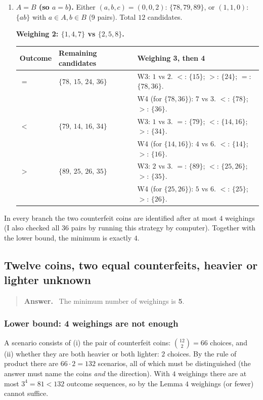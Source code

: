 \documentclass[11pt,a4paper]{article}
\renewcommand{\arraystretch}{1.15}
\newenvironment{answerbox}[1][Answer]{\par\smallskip\begin{quote}\textbf{#1.}\ }{\end{quote}}
\theoremstyle{definition}
\begin{document}
\begin{enumerate}[label=\textbf{Case \arabic*.},leftmargin=*,itemsep=6pt]
\item \textbf{$A=B$ (so $a=b$).} Either $(a,b,c)=(0,0,2)$: $\{78,79,89\}$, or $(1,1,0)$: $\{ab\}$ with $a\in A,b\in B$ (9 pairs). Total $12$ candidates.

 \textbf{Weighing 2: $\{1,4,7\}$ vs $\{2,5,8\}$.}
 \begin{center}\small
 \renewcommand{\arraystretch}{1.2}
 \begin{tabular}{@{}lll@{}}
 \toprule
 Outcome & Remaining candidates & Weighing 3, then 4 \\
 \midrule
 $=$ & $\{78,\,15,\,24,\,36\}$ & W3: $1$ vs $2$. $<$: $\{15\}$; $>$: $\{24\}$; $=$: $\{78,36\}$.\\
 & & W4 (for $\{78,36\}$): $7$ vs $3$. $<$: $\{78\}$; $>$: $\{36\}$.\\[2pt]
 $<$ & $\{79,\,14,\,16,\,34\}$ & W3: $1$ vs $3$. $=$: $\{79\}$; $<$: $\{14,16\}$; $>$: $\{34\}$.\\
 & & W4 (for $\{14,16\}$): $4$ vs $6$. $<$: $\{14\}$; $>$: $\{16\}$.\\[2pt]
 $>$ & $\{89,\,25,\,26,\,35\}$ & W3: $2$ vs $3$. $=$: $\{89\}$; $<$: $\{25,26\}$; $>$: $\{35\}$.\\
 & & W4 (for $\{25,26\}$): $5$ vs $6$. $<$: $\{25\}$; $>$: $\{26\}$.\\
 \bottomrule
 \end{tabular}
 \end{center}
\end{enumerate}
In every branch the two counterfeit coins are identified after at most $4$ weighings (I also checked all $36$ pairs by running this strategy by computer). Together with the lower bound, the minimum is exactly $4$. 





\subsection{Twelve coins, two equal counterfeits, heavier or lighter unknown}

\begin{answerbox}
The minimum number of weighings is \textbf{5}.
\end{answerbox}

\subsubsection*{Lower bound: 4 weighings are not enough}
A scenario consists of (i) the pair of counterfeit coins: $\binom{12}{2}=66$ choices, and (ii) whether they are both heavier or both lighter: $2$ choices. By the rule of product there are $66\cdot2=132$ scenarios, all of which must be distinguished (the answer must name the coins \emph{and} the direction).
With $4$ weighings there are at most $3^4=81<132$ outcome sequences, so by the Lemma $4$ weighings (or fewer) cannot suffice. 
\end{document}
